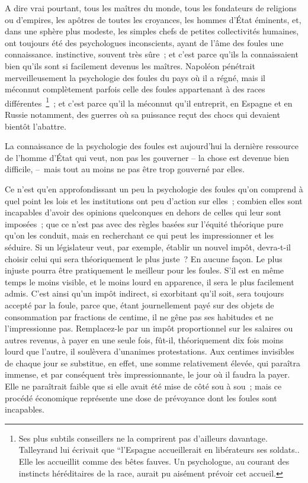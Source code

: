 \documentclass[french,twoside]{book} %
\begin{document}
A dire vrai pourtant, tous les maîtres du monde, tous les fondateurs de religions ou d’empires, les apôtres de toutes les croyances, les hommes d’État éminents, et, dans une sphère plus modeste, les simples chefs de petites collectivités humaines, ont toujours été des psychologues inconscients, ayant de l’âme des foules une connais­sance. instinctive, souvent très sûre ; et c’est parce qu’ils la connaissaient bien qu’ils sont si facilement devenus les maîtres. Napoléon pénétrait merveilleusement la psychologie des foules du pays où il a régné, mais il méconnut complètement parfois celle des foules appartenant à des races différentes \footnote{Ses plus subtils conseillers ne la comprirent pas d’ailleurs davantage. Talleyrand lui écrivait que “l’Espagne accueillerait en libérateurs ses soldats.. Elle les accueillit comme des bêtes fauves. Un psychologue, au courant des instincts héréditaires de la race, aurait pu aisément prévoir cet accueil.} ; et c’est parce qu’il la méconnut qu’il entreprit, en Espagne et en Russie notamment, des guerres où sa puissance reçut des chocs qui devaient bientôt l’abattre.\par
La connaissance de la psychologie des foules est aujourd’hui la dernière ressource de l’homme d’État qui veut, non pas les gouverner – la chose est devenue bien diffi­cile, – mais tout au moins ne pas être trop gouverné par elles.\par
Ce n’est qu’en approfondissant un peu la psychologie des foules qu’on comprend à quel point les lois et les institutions ont peu d’action sur elles ; combien elles sont incapables d’avoir des opinions quelconques en dehors de celles qui leur sont imposées ; que ce n’est pas avec des règles basées sur l’équité théorique pure qu’on les conduit, mais en recherchant ce qui peut les impressionner et les séduire. Si un législateur veut, par exemple, établir un nouvel impôt, devra-t-il choisir celui qui sera théoriquement le plus juste ? En aucune façon. Le plus injuste pourra être pratique­ment le meilleur pour les foules. S’il est en même temps le moins visible, et le moins lourd en apparence, il sera le plus facilement admis. C’est ainsi qu’un impôt indirect, si exorbitant qu’il soit, sera toujours accepté par la foule, parce que, étant journelle­ment payé sur des objets de consommation par fractions de centime, il ne gêne pas ses habitudes et ne l’impressionne pas. Remplacez-le par un impôt proportionnel sur les salaires ou autres revenus, à payer en une seule fois, fût-il, théoriquement dix fois moins lourd que l’autre, il soulèvera d’unanimes protestations. Aux centimes invisi­bles de chaque jour se substitue, en effet, une somme relative­ment élevée, qui paraî­tra immense, et par conséquent très impressionnante, le jour où il faudra la payer. Elle ne paraîtrait faible que si elle avait été mise de côté sou à sou ; mais ce procédé économique représente une dose de prévoyance dont les foules sont incapables.\par
\end{document}
